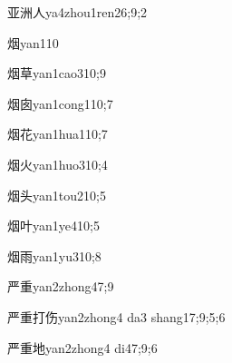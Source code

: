 \begin{verbete}{亚洲人}{ya4zhou1ren2}{6;9;2}
\end{verbete}

\begin{verbete}{烟}{yan1}{10}
\end{verbete}

\begin{verbete}{烟草}{yan1cao3}{10;9}
\end{verbete}

\begin{verbete}{烟囱}{yan1cong1}{10;7}
\end{verbete}

\begin{verbete}{烟花}{yan1hua1}{10;7}
\end{verbete}

\begin{verbete}{烟火}{yan1huo3}{10;4}
\end{verbete}

\begin{verbete}{烟头}{yan1tou2}{10;5}
\end{verbete}

\begin{verbete}{烟叶}{yan1ye4}{10;5}
\end{verbete}

\begin{verbete}{烟雨}{yan1yu3}{10;8}
\end{verbete}

\begin{verbete}{严重}{yan2zhong4}{7;9}
\end{verbete}

\begin{verbete}{严重打伤}{yan2zhong4 da3 shang1}{7;9;5;6}
\end{verbete}

\begin{verbete}{严重地}{yan2zhong4 di4}{7;9;6}
\end{verbete}

